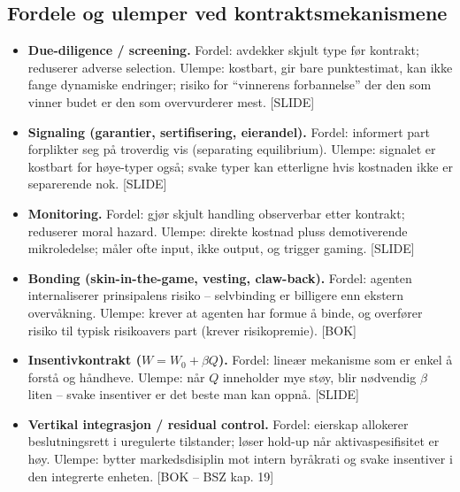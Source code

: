 \subsection*{Fordele og ulemper ved kontraktsmekanismene}
\begin{itemize}\setlength{\itemsep}{2pt}
\item \textbf{Due-diligence / screening.} Fordel: avdekker skjult type før kontrakt; reduserer adverse selection. Ulempe: kostbart, gir bare punktestimat, kan ikke fange dynamiske endringer; risiko for ``vinnerens forbannelse'' der den som vinner budet er den som overvurderer mest. [SLIDE]
\item \textbf{Signaling (garantier, sertifisering, eierandel).} Fordel: informert part forplikter seg på troverdig vis (separating equilibrium). Ulempe: signalet er kostbart for høye-typer også; svake typer kan etterligne hvis kostnaden ikke er separerende nok. [SLIDE]
\item \textbf{Monitoring.} Fordel: gjør skjult handling observerbar etter kontrakt; reduserer moral hazard. Ulempe: direkte kostnad pluss demotiverende mikroledelse; måler ofte input, ikke output, og trigger gaming. [SLIDE]
\item \textbf{Bonding (skin-in-the-game, vesting, claw-back).} Fordel: agenten internaliserer prinsipalens risiko -- selvbinding er billigere enn ekstern overvåkning. Ulempe: krever at agenten har formue å binde, og overfører risiko til typisk risikoavers part (krever risikopremie). [BOK]
\item \textbf{Insentivkontrakt ($W = W_0 + \beta Q$).} Fordel: lineær mekanisme som er enkel å forstå og håndheve. Ulempe: når $Q$ inneholder mye støy, blir nødvendig $\beta$ liten -- svake insentiver er det beste man kan oppnå. [SLIDE]
\item \textbf{Vertikal integrasjon / residual control.} Fordel: eierskap allokerer beslutningsrett i uregulerte tilstander; løser hold-up når aktivaspesifisitet er høy. Ulempe: bytter markedsdisiplin mot intern byråkrati og svake insentiver i den integrerte enheten. [BOK -- BSZ kap. 19]
\end{itemize}

